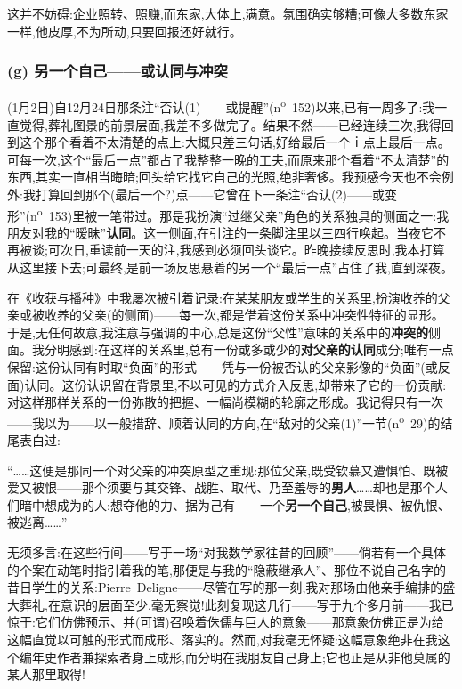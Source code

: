 这并不妨碍:企业照转、照赚,而东家,大体上,满意。氛围确实够糟;可像大多数东家一样,他皮厚,不为所动,只要回报还好就行。

\subsubsection*{(g) 另一个自己——或认同与冲突}
\label{ch18:local:h68}

\label{ch18:local:n63}

(1月2日)自12月24日那条注“否认(1)——或提醒”(n\textsuperscript{o}~152)以来,已有一周多了:我一直觉得,葬礼图景的前景层面,我差不多做完了。结果不然——已经连续三次,我得回到这个那个看着不太清楚的点上:大概只差三句话,好给最后一个ｉ点上最后一点。可每一次,这个“最后一点”都占了我整整一晚的工夫,而原来那个看着“不太清楚”的东西,其实一直相当晦暗;回头给它找它自己的光照,绝非奢侈。我预感今天也不会例外:我打算回到那个(最后一个?)点——它曾在下一条注“否认(2)——或变形”(n\textsuperscript{o}~153)里被一笔带过。那是我扮演“过继父亲”角色的关系独具的侧面之一:我朋友对我的“暧昧”\textbf{认同}。这一侧面,在引注的一条脚注里以三四行唤起。当夜它不再被谈;可次日,重读前一天的注,我感到必须回头谈它。昨晚接续反思时,我本打算从这里接下去;可最终,是前一场反思悬着的另一个“最后一点”占住了我,直到深夜。

在《收获与播种》中我屡次被引着记录:在某某朋友或学生的关系里,扮演收养的父亲或被收养的父亲\dmark{}(的侧面)——每一次,都是借着这份关系中冲突性特征的显形。于是,无任何故意,我注意与强调的中心,总是这份“父性”意味的关系中的\textbf{冲突的}侧面。我分明感到:在这样的关系里,总有一份或多或少的\textbf{对父亲的认同}成分;唯有一点保留:这份认同有时取“负面”的形式——凭与一份被否认的父亲影像的“负面”(或反面)认同。这份认识留在背景里,不以可见的方式介入反思,却带来了它的一份贡献:对这样那样关系的一份弥散的把握、一幅尚模糊的轮廓之形成。我记得只有一次——我以为——以一般措辞、顺着认同的方向,在“敌对的父亲(1)”一节(n\textsuperscript{o}~29)的结尾表白过:

“……这便是那同一个对父亲的冲突原型之重现:那位父亲,既受钦慕又遭惧怕、既被爱又被恨——那个须要与其交锋、战胜、取代、乃至羞辱的\textbf{男人}……却也是那个人们暗中想成为的人:想夺他的力、据为己有——一个\textbf{另一个自己},被畏惧、被仇恨、被逃离……”

无须多言:在这些行间——写于一场“对我数学家往昔的回顾”——倘若有一个具体的个案在动笔时指引着我的笔,那便是与我的“隐蔽继承人”、那位不说自己名字的昔日学生的关系:Pierre~Deligne——尽管在写的那一刻,我对那场由他亲手编排的盛大葬礼,在意识的层面至少,毫无察觉!此刻复现这几行——写于九个多月前——我已惊于:它们仿佛预示、并(可谓)召唤着侏儒与巨人的意象——那意象仿佛正是为给这幅直觉以可触的形式而成形、落实的。然而,对我毫无怀疑:这幅意象绝非在我这个编年史作者兼探索者身上成形,而分明在我朋友自己身上;它也正是从非他莫属的某人那里取得!

